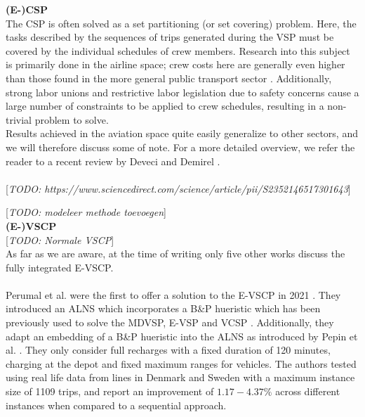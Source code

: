 \documentclass[ht]{article}
\newcommand{\todo}[1]{{\color{red}[\textit{TODO: #1}]}}
\begin{document}
\noindent \textbf{(E-)CSP}\\
The CSP is often solved as a set partitioning (or set covering) problem. Here, the tasks described by the sequences of trips generated during the VSP must be covered by the individual schedules of crew members. Research into this subject is primarily done in the airline space; crew costs here are generally even higher than those found in the more general public transport sector \cite{Barnhart2003}. Additionally, strong labor unions and restrictive labor legislation due to safety concerns cause a large number of constraints to be applied to crew schedules, resulting in a non-trivial problem to solve. \\
Results achieved in the aviation space quite easily generalize to other sectors, and we will therefore discuss some of note. For a more detailed overview, we refer the reader to a recent review by Deveci and Demirel \cite{Deveci2018}. \\\\
\todo{https://www.sciencedirect.com/science/article/pii/S2352146517301643}
  
\todo{modeleer methode toevoegen}\\

\noindent \textbf{(E-)VSCP}\\
\todo{Normale VSCP}\\
As far as we are aware, at the time of writing only five other works discuss the fully integrated E-VSCP. \\\\

Perumal et al. were the first to offer a solution to the E-VSCP in 2021
\cite{Perumal2021}. They introduced an ALNS which incorporates a B\&P hueristic
which has been previously used to solve the MDVSP, E-VSP and VCSP
\cite{Pepin2009, Haase1996, vanKootenNiekerk2017}. Additionally, they adapt an
embedding of a B\&P hueristic into the ALNS as introduced by Pepin et al.
\cite{Pepin2009}. They only consider full recharges with a fixed duration of
120 minutes, charging at the depot and fixed maximum ranges for vehicles. The
authors tested using real life data from lines in Denmark and Sweden with a
maximum instance size of 1109 trips, and report an improvement of $1.17-4.37\%$
across different instances when compared to a sequential approach. \\\\
\end{document}
